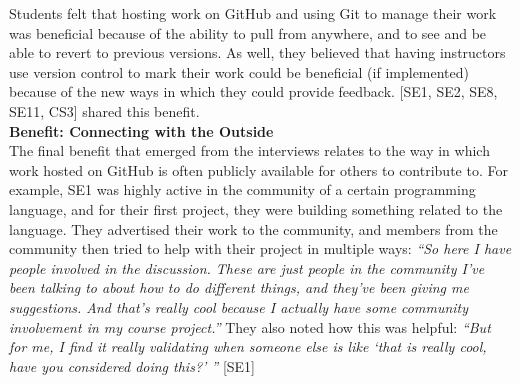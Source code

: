 Students felt that hosting work on GitHub and using Git to manage their work was beneficial because of the ability to pull from anywhere, and to see and be able to revert to previous versions. As well, they believed that having instructors use version control to mark their work could be beneficial (if implemented) because of the new ways in which they could provide feedback. [SE1, SE2, SE8, SE11, CS3] shared this benefit. \\




\textbf{Benefit: Connecting with the Outside} \\
The final benefit that emerged from the interviews relates to the way in which work hosted on GitHub is often publicly available for others to contribute to. For example, SE1 was highly active in the community of a certain programming language, and for their first project, they were building something related to the language. They advertised their work to the community, and members from the community then tried to help with their project in multiple ways: \textit{``So here I have people involved in the discussion. These are just people in the community I've been talking to about how to do different things, and they've been giving me suggestions. And that's really cool because I actually have some community involvement in my course project.''} They also noted how this was helpful: \textit{``But for me, I find it really validating when someone else is like `that is really cool, have you considered doing this?' ''} [SE1]

